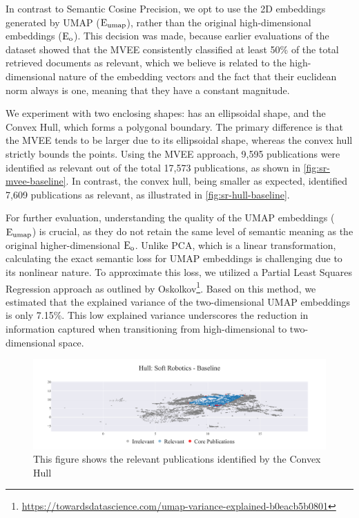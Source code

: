 In contrast to Semantic Cosine Precision, we opt to use the 2D embeddings generated by UMAP ($\mathop{}\!\mathrm{E_{umap}}$), rather than the original high-dimensional embeddings ($\mathop{}\!\mathrm{E_{o}}$). This decision was made, because earlier evaluations of the dataset showed that the MVEE consistently classified at least 50\% of the total retrieved documents as relevant, which we believe is related to the high-dimensional nature of the embedding vectors and the fact that their euclidean norm always is one, meaning that they have a constant magnitude.

We experiment with two enclosing shapes: has an ellipsoidal shape, and the Convex Hull, which forms a polygonal boundary.  The primary difference is that the MVEE tends to be larger due to its ellipsoidal shape, whereas the convex hull strictly bounds the points. Using the MVEE approach, 9,595 publications were identified as relevant out of the total 17,573 publications, as shown in \autoref{fig:sr-mvee-baseline}. In contrast, the convex hull, being smaller as expected, identified 7,609 publications as relevant, as illustrated in \autoref{fig:sr-hull-baseline}.

For further evaluation, understanding the quality of the UMAP embeddings ($\mathop{}\!\mathrm{E_{umap}}$) is crucial, as they do not retain the same level of semantic meaning as the original higher-dimensional $\mathop{}\!\mathrm{E_{o}}$. Unlike PCA, which is a linear transformation, calculating the exact semantic loss for UMAP embeddings is challenging due to its nonlinear nature. To approximate this loss, we utilized a Partial Least Squares Regression approach as outlined by Oskolkov\footnote{\url{https://towardsdatascience.com/umap-variance-explained-b0eacb5b0801}}. Based on this method, we estimated that the explained variance of the two-dimensional UMAP embeddings is only 7.15\%. This low explained variance underscores the reduction in information captured when transitioning from high-dimensional to two-dimensional space.

\begin{figure}[!hb]
	\hspace*{-1cm}	
	\includegraphics[scale=0.45]{pics/sr-hull-baseline.pdf}
	\caption[Semantic Cosine Threshold: Empirical Analysis]{This figure shows the relevant publications identified by the Convex Hull}\label{fig:sr-hull-baseline}
\end{figure}


